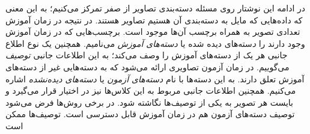 در ادامه این نوشتار روی مسئله دسته‌بندی تصاویر از صفر تمرکز می‌کنیم؛ به این معنی که داده‌هایی که مایل به دسته‌بندی آن هستیم تصاویر هستند. در نتیجه در زمان آموزش تعدادی تصویر به همراه برچسب آن‌ها موجود است. برچسب‌هایی که در زمان آموزش وجود دارند را {\emph دسته‌های دیده شده} یا \emph{ دسته‌های آموزش} می‌نامیم. همچنین یک نوع اطلاع جانبی هر یک از دسته‌های آموزش را وصف می‌کند؛ به این اطلاعات جانبی \emph{ توصیف}  می‌گوییم. در زمان آزمون تصاویری ارائه می‌شود که به دسته‌هایی غیر از دسته‌های آموزش تعلق دارند. به این دسته‌ها با نام\emph{  دسته‌های آزمون}  یا \emph{ دسته‌های دیده‌نشده}  اشاره می‌کنیم. همچنین اطلاعات جانبی مربوط به این کلاس‌ها نیز در اختیار قرار می‌گیرد و بایست هر تصویر به یکی از توصیف‌ها نگاشته شود. در برخی روش‌ها فرض می‌شود توصیف دسته‌های آزمون هم در زمان آموزش قابل دسترسی است. توصیف‌ها ممکن است 


